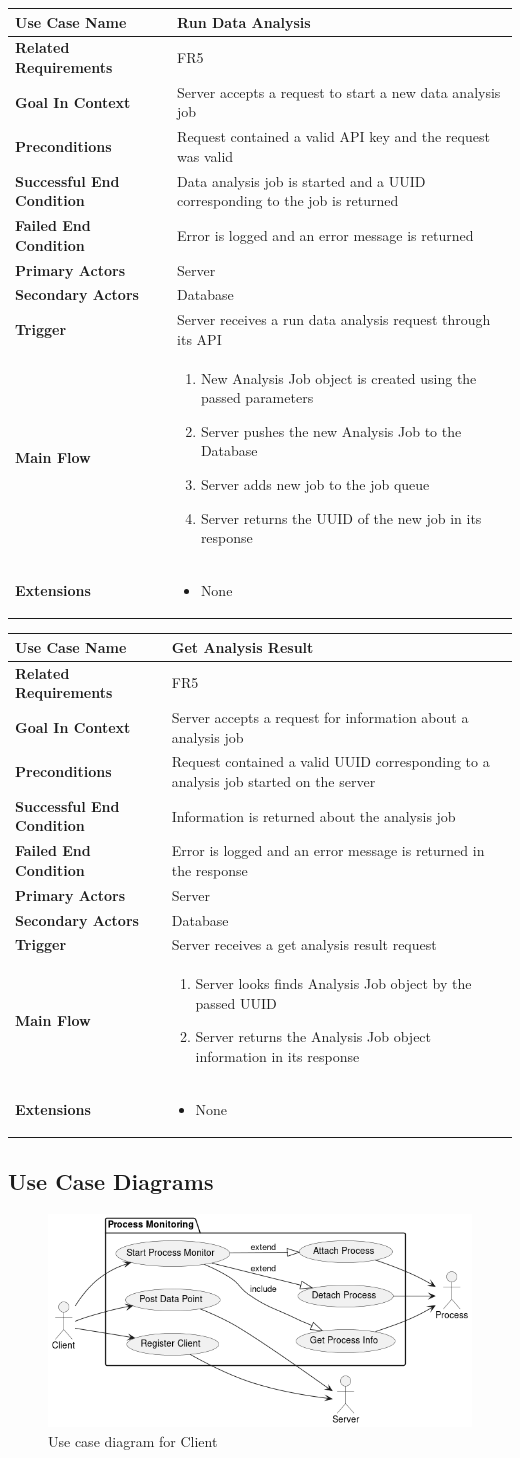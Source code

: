 \documentclass[titlepage]{article}
\newcommand{\longUseCase}[3]
{
    \def\tempMainFlow{#1}%
    \def\tempExtension{#2}%
    \usecase#3
}
\newcommand{\usecase}[9]
{
    \begin{table}[H]
        \centering
        \begin{tabularx}{\textwidth}{|X | X|}
        \hline
            \textbf{Use Case Name} & #1\\
        \hline
            \textbf{Related Requirements} & #2\\
        \hline
            \textbf{Goal In Context} & #3\\
        \hline
            \textbf{Preconditions} & #4\\
        \hline
            \textbf{Successful End Condition} & #5\\
        \hline
            \textbf{Failed End Condition} & #6\\
        \hline
            \textbf{Primary Actors} & #7\\
        \hline
            \textbf{Secondary Actors} & #8\\
        \hline
            \textbf{Trigger} & #9\\
        \hline
            \textbf{Main Flow} & \tempMainFlow\\
        \hline
            \textbf{Extensions} & \tempExtension\\
        \hline
        \end{tabularx}
    \end{table}
    
}
\begin{document}
\longUseCase
{
\begin{enumerate}
   \item New Analysis Job object is created using the passed parameters
    \item Server pushes the new Analysis Job to the Database
    \item Server adds new job to the job queue
    \item Server returns the UUID of the new job in its response
\end{enumerate}
}
{
\begin{itemize}
    \item None
\end{itemize}
}
{
{Run Data Analysis}
{FR5}
{Server accepts a request to start a new data analysis job}
{Request contained a valid API key and the request was valid}
{Data analysis job is started and a UUID corresponding to the job is returned}
{Error is logged and an error message is returned }
{Server}
{Database}
{Server receives a run data analysis request through its API}
}
\longUseCase
{
\begin{enumerate}
    \item Server looks finds Analysis Job object by the passed UUID
    \item Server returns the Analysis Job object information in its response
\end{enumerate}
}
{
\begin{itemize}
    \item None
\end{itemize}
}
{
{Get Analysis Result}
{FR5}
{Server accepts a request for information about a analysis job}
{Request contained a valid UUID corresponding to a analysis job started on the server}
{Information is returned about the analysis job }
{Error is logged and an error message is returned in the response}
{Server}
{Database}
{Server receives a get analysis result request}
}
\subsection{Use Case Diagrams}

\begin{figure}[H]
\includegraphics[scale=.7]{client.png}
\caption{Use case diagram for Client}
\centering
\end{figure}
\end{document}
